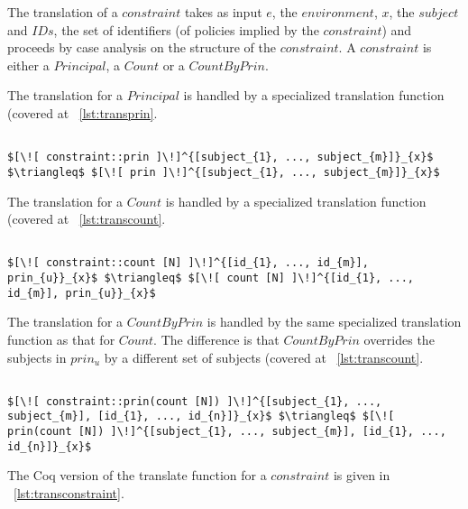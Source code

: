 The translation of a $constraint$ takes as input $e$, the $environment$, $x$, the $subject$ and $IDs$, the set of identifiers (of policies implied by the $constraint$) and proceeds by case analysis on the structure of the $constraint$. A $constraint$ is either a $Principal$, a $Count$ or a $CountByPrin$.

The translation for a $Principal$ is handled by a specialized translation function (covered at ~\ref{lst:transprin}.   

\lstset{mathescape, language=AST}  
\begin{lstlisting}[frame=single, caption={Constraint Translation {$\colon$} Principal},label={lst:transconstraintPrin}]

$[\![ constraint::prin ]\!]^{[subject_{1}, ..., subject_{m}]}_{x}$ $\triangleq$ $[\![ prin ]\!]^{[subject_{1}, ..., subject_{m}]}_{x}$ 
\end{lstlisting}

The translation for a $Count$ is handled by a specialized translation function (covered at ~\ref{lst:transcount}.

\lstset{mathescape, language=AST}  
\begin{lstlisting}[frame=single, caption={Constraint Translation {$\colon$} Count},label={lst:transconstraintCount}]

$[\![ constraint::count [N] ]\!]^{[id_{1}, ..., id_{m}], prin_{u}}_{x}$ $\triangleq$ $[\![ count [N] ]\!]^{[id_{1}, ..., id_{m}], prin_{u}}_{x}$ 
\end{lstlisting}

The translation for a $CountByPrin$ is handled by the same specialized translation function as that for $Count$. The difference is that $CountByPrin$ overrides the subjects in $prin_{u}$ by a different set of subjects (covered at ~\ref{lst:transcount}.

\lstset{mathescape, language=AST}  
\begin{lstlisting}[frame=single, caption={Constraint Translation {$\colon$} Count by Principal},label={lst:transconstraintCountbyPrin}]

$[\![ constraint::prin(count [N]) ]\!]^{[subject_{1}, ..., subject_{m}], [id_{1}, ..., id_{n}]}_{x}$ $\triangleq$ $[\![ prin(count [N]) ]\!]^{[subject_{1}, ..., subject_{m}], [id_{1}, ..., id_{n}]}_{x}$ 
\end{lstlisting}

The Coq version of the translate function for a $constraint$ is given in ~\ref{lst:transconstraint}. 

